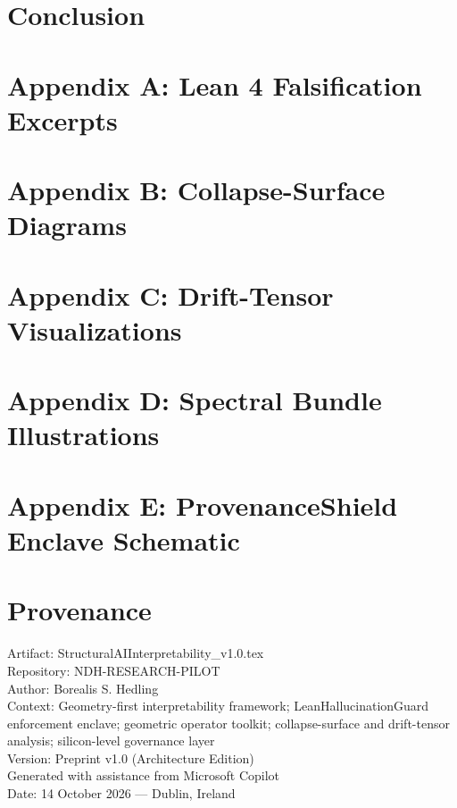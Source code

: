 \section{Conclusion}

\appendix
\section{Appendix A: Lean 4 Falsification Excerpts}
\section{Appendix B: Collapse-Surface Diagrams}
\section{Appendix C: Drift-Tensor Visualizations}
\section{Appendix D: Spectral Bundle Illustrations}
\section{Appendix E: ProvenanceShield Enclave Schematic}

\section*{Provenance}
Artifact: StructuralAIInterpretability\_v1.0.tex\\
Repository: NDH-RESEARCH-PILOT\\
Author: Borealis S. Hedling\\
Context: Geometry-first interpretability framework; LeanHallucinationGuard enforcement enclave;
geometric operator toolkit; collapse-surface and drift-tensor analysis; silicon-level governance layer\\
Version: Preprint v1.0 (Architecture Edition)\\
Generated with assistance from Microsoft Copilot\\
Date: 14 October 2026 --- Dublin, Ireland


